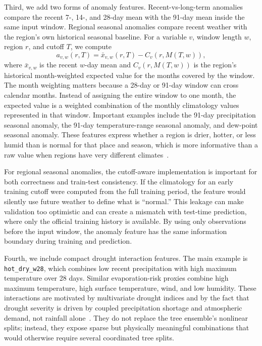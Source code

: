 \documentclass[conference]{IEEEtran}
\begin{document}
Third, we add two forms of anomaly features. Recent-vs-long-term anomalies
compare the recent 7-, 14-, and 28-day mean with the 91-day mean inside the same
input window. Regional seasonal anomalies compare recent weather with the
region's own historical seasonal baseline. For a variable $v$, window length
$w$, region $r$, and cutoff $T$, we compute
\begin{equation}
a_{v,w}(r,T) =
\bar{x}_{v,w}(r,T) - C_v(r, M(T,w)),
\end{equation}
where $\bar{x}_{v,w}$ is the recent $w$-day mean and $C_v(r, M(T,w))$ is the
region's historical month-weighted expected value for the months covered by the
window. The month weighting matters because a 28-day or 91-day window can cross
calendar months. Instead of assigning the entire window to one month, the
expected value is a weighted combination of the monthly climatology values
represented in that window. Important examples include the 91-day precipitation
seasonal anomaly, the 91-day temperature-range seasonal anomaly, and dew-point
seasonal anomaly. These features express whether a region is drier, hotter, or
less humid than is normal for that place and season, which is more informative
than a raw value when regions have very different
climates~\cite{vicente2010spei,mishra2010review}.

For regional seasonal anomalies, the cutoff-aware implementation is important
for both correctness and train-test consistency. If the climatology for an early
training cutoff were computed from the full training period, the feature would
silently use future weather to define what is ``normal.'' This leakage can make
validation too optimistic and can create a mismatch with test-time prediction,
where only the official training history is available. By using only
observations before the input window, the anomaly feature has the same
information boundary during training and prediction.

Fourth, we include compact drought interaction features. The main example is
\texttt{hot\_dry\_w28}, which combines low recent precipitation with high
maximum temperature over 28 days. Similar evaporation-risk proxies combine high
maximum temperature, high surface temperature, wind, and low humidity. These
interactions are motivated by multivariate drought indices and by the fact that
drought severity is driven by coupled precipitation shortage and atmospheric
demand, not rainfall alone~\cite{hao2013msdi,vicente2010spei}. They do not
replace the tree ensemble's nonlinear splits; instead, they expose sparse but
physically meaningful combinations that would otherwise require several
coordinated tree splits.
\end{document}
